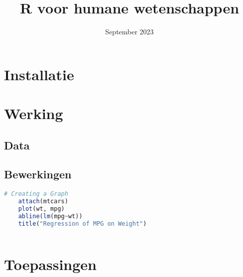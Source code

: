 \documentclass[a4paper,12pt, dutch, oneside ]{book}
\begin{document}
\title{R voor humane wetenschappen}
\date{September 2023}

\maketitle
\tableofcontents

\chapter{Installatie}

%

\chapter{Werking}


\section{Data}

\section{Bewerkingen}

\begin{lstlisting}[language=R]
    # Creating a Graph
    attach(mtcars)
    plot(wt, mpg)
    abline(lm(mpg~wt))
    title("Regression of MPG on Weight")
    
\end{lstlisting}


\chapter{Toepassingen}
\end{document}
